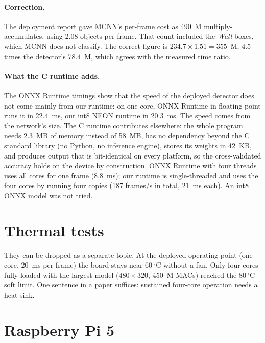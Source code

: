\documentclass[11pt,a4paper]{article}
\begin{document}
\paragraph{Correction.} The deployment report gave MCNN's per-frame cost as
490~M multiply-accumulates, using 2.08 objects per frame. That count
included the \emph{Wall} boxes, which MCNN does not classify. The correct
figure is $234.7 \times 1.51 = 355$~M, 4.5 times the detector's 78.4~M,
which agrees with the measured time ratio.

\paragraph{What the C runtime adds.} The ONNX Runtime timings show that the
speed of the deployed detector does not come mainly from our runtime: on
one core, ONNX Runtime in floating point runs it in 22.4~ms, our int8 NEON
runtime in 20.3~ms. The speed comes from the network's size. The C runtime
contributes elsewhere: the whole program needs 2.3~MB of memory instead of
58~MB, has no dependency beyond the C standard library (no Python, no
inference engine), stores its weights in 42~KB, and produces output that is
bit-identical on every platform, so the cross-validated accuracy holds on
the device by construction. ONNX Runtime with four threads uses all cores for
one frame (8.8~ms); our runtime is single-threaded and uses the four cores
by running four copies (187 frames/s in total, 21~ms each). An int8 ONNX
model was not tried.

\section{Thermal tests}
\label{sec:thermal}

They can be dropped as a separate topic. At the deployed operating point
(one core, 20~ms per frame) the board stays near 60\,$^\circ$C without a
fan. Only four cores fully loaded with the largest model
($480 \times 320$, 450~M MACs) reached the 80\,$^\circ$C soft limit. One
sentence in a paper suffices: sustained four-core operation needs a heat
sink.

\section{Raspberry Pi 5}
\label{sec:pi5}
\end{document}
